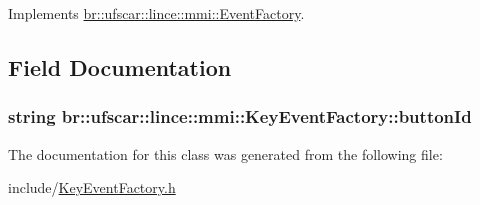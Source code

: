 Implements \hyperlink{classbr_1_1ufscar_1_1lince_1_1mmi_1_1EventFactory_a19ad2165726a29a55c921f569764290b}{br::ufscar::lince::mmi::EventFactory}.



\subsection{Field Documentation}
\hypertarget{classbr_1_1ufscar_1_1lince_1_1mmi_1_1KeyEventFactory_a34a7fe739dd5ed97ee418df3c99c2e2c}{
\subsubsection[{buttonId}]{\setlength{\rightskip}{0pt plus 5cm}string {\bf br::ufscar::lince::mmi::KeyEventFactory::buttonId}}}
\label{classbr_1_1ufscar_1_1lince_1_1mmi_1_1KeyEventFactory_a34a7fe739dd5ed97ee418df3c99c2e2c}


The documentation for this class was generated from the following file:\begin{DoxyCompactItemize}
\item 
include/\hyperlink{KeyEventFactory_8h}{KeyEventFactory.h}\end{DoxyCompactItemize}
